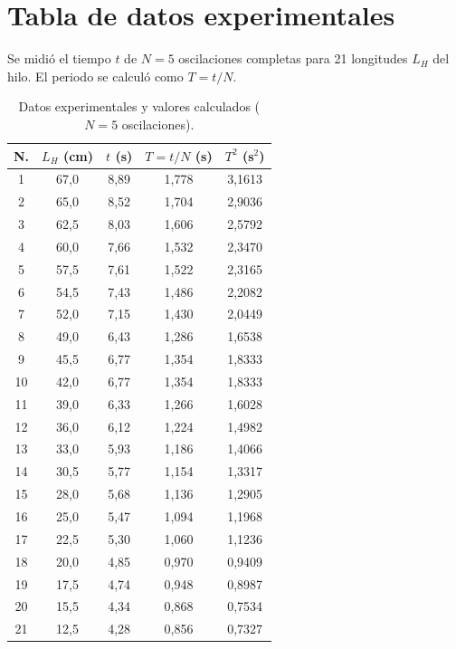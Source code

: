 \documentclass[12pt,a4paper]{article}
\begin{document}
\section{Tabla de datos experimentales}
Se midi\'o el tiempo $t$ de $N = 5$ oscilaciones completas para 21 longitudes $L_H$ del hilo. El periodo se calcul\'o como $T = t/N$.

\begin{table}[h!]
    \centering
    \caption{Datos experimentales y valores calculados ($N = 5$ oscilaciones).}
    \begin{tabular}{ccccc}
        \toprule
        N. & $L_H$ (cm) & $t$ (s) & $T = t/N$ (s) & $T^2$ (s$^2$) \\
        \midrule
        1  & 67,0 & 8,89 & 1,778 & 3,1613 \\
        2  & 65,0 & 8,52 & 1,704 & 2,9036 \\
        3  & 62,5 & 8,03 & 1,606 & 2,5792 \\
        4  & 60,0 & 7,66 & 1,532 & 2,3470 \\
        5  & 57,5 & 7,61 & 1,522 & 2,3165 \\
        6  & 54,5 & 7,43 & 1,486 & 2,2082 \\
        7  & 52,0 & 7,15 & 1,430 & 2,0449 \\
        8  & 49,0 & 6,43 & 1,286 & 1,6538 \\
        9  & 45,5 & 6,77 & 1,354 & 1,8333 \\
        10 & 42,0 & 6,77 & 1,354 & 1,8333 \\
        11 & 39,0 & 6,33 & 1,266 & 1,6028 \\
        12 & 36,0 & 6,12 & 1,224 & 1,4982 \\
        13 & 33,0 & 5,93 & 1,186 & 1,4066 \\
        14 & 30,5 & 5,77 & 1,154 & 1,3317 \\
        15 & 28,0 & 5,68 & 1,136 & 1,2905 \\
        16 & 25,0 & 5,47 & 1,094 & 1,1968 \\
        17 & 22,5 & 5,30 & 1,060 & 1,1236 \\
        18 & 20,0 & 4,85 & 0,970 & 0,9409 \\
        19 & 17,5 & 4,74 & 0,948 & 0,8987 \\
        20 & 15,5 & 4,34 & 0,868 & 0,7534 \\
        21 & 12,5 & 4,28 & 0,856 & 0,7327 \\
        \bottomrule
    \end{tabular}
\end{table}
\end{document}
